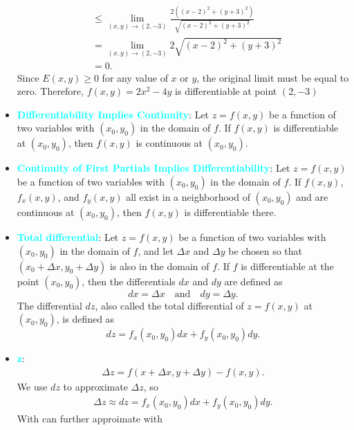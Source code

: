 \documentclass{report}
\begin{document}
\begin{itemize}
\begin{align*}
            &\leq \lim\limits_{(x,y) \to (2,-3)}{\frac{2((x-2)^{2}+(y+3)^{2})}{\sqrt{(x-2)^{2}+(y+3)^{2}}}} \\
            &=\lim\limits_{(x,y) \to (2,-3)}{2\sqrt{(x-2)^{2} + (y+3)^{2}}} \\
            &=0
            .\end{align*}
            \bigbreak \noindent 
            Since $E(x,y) \geq 0$ for any value of $x$ or $y$, the original limit must be equal to zero. Therefore, $f(x,y) = 2x^{2}-4y$ is differentiable  at point $(2,-3) $
        \item \textbf{\textcolor{cyan}{Differentiability Implies Continuity}}:
        Let \(z = f(x,y)\) be a function of two variables with \((x_0,y_0)\) in the domain of \(f\). If \(f(x,y)\) is differentiable at \((x_0,y_0)\), then \(f(x,y)\) is continuous at \((x_0,y_0)\).
    \item \textbf{\textcolor{cyan}{Continuity of First Partials Implies Differentiability}}:
        Let \(z = f(x,y)\) be a function of two variables with \((x_0,y_0)\) in the domain of \(f\). If \(f(x,y)\), \(f_x(x,y)\), and \(f_y(x,y)\) all exist in a neighborhood of \((x_0,y_0)\) and are continuous at \((x_0,y_0)\), then \(f(x,y)\) is differentiable there.
    \item \textbf{\textcolor{cyan}{Total differential}}:
        Let \(z = f(x,y)\) be a function of two variables with \((x_0,y_0)\) in the domain of \(f\), and let \(\Delta x\) and \(\Delta y\) be chosen so that \((x_0 + \Delta x, y_0 + \Delta y)\) is also in the domain of \(f\). If \(f\) is differentiable at the point \((x_0,y_0)\), then the differentials \(dx\) and \(dy\) are defined as
        \[dx = \Delta x \quad \text{and} \quad dy = \Delta y.\]
        The differential \(dz\), also called the total differential of \(z = f(x,y)\) at \((x_0,y_0)\), is defined as
        \[dz = f_x(x_0,y_0)dx + f_y(x_0,y_0)dy.\]
    \item \textbf{\textcolor{cyan}{\Delta z}}:
        \begin{align*}
            \Delta z = f(x+\Delta x, y+\Delta y) - f(x,y)
        .\end{align*}
        \bigbreak \noindent 
        We use  $dz$ to approximate  $\Delta z$, so
        \begin{align*}
            \Delta z \approx dz = f_{x}(x_{0},y_{0})dx + f_{y}(x_{0},y_{0})dy
        .\end{align*}
        With can further approimate with
        \begin{align*}

\end{align*}
\end{itemize}
\end{document}
